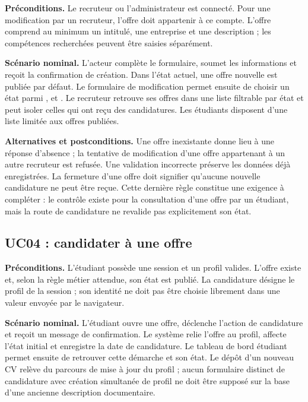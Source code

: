 \textbf{Préconditions.} Le recruteur ou l'administrateur est connecté. Pour une modification par un recruteur, l'offre doit appartenir à ce compte. L'offre comprend au minimum un intitulé, une entreprise et une description ; les compétences recherchées peuvent être saisies séparément.

\textbf{Scénario nominal.} L'acteur complète le formulaire, soumet les informations et reçoit la confirmation de création. Dans l'état actuel, une offre nouvelle est publiée par défaut. Le formulaire de modification permet ensuite de choisir un état parmi ,  et . Le recruteur retrouve ses offres dans une liste filtrable par état et peut isoler celles qui ont reçu des candidatures. Les étudiants disposent d'une liste limitée aux offres publiées.

\textbf{Alternatives et postconditions.} Une offre inexistante donne lieu à une réponse d'absence ; la tentative de modification d'une offre appartenant à un autre recruteur est refusée. Une validation incorrecte préserve les données déjà enregistrées. La fermeture d'une offre doit signifier qu'aucune nouvelle candidature ne peut être reçue. Cette dernière règle constitue une exigence à compléter : le contrôle existe pour la consultation d'une offre par un étudiant, mais la route de candidature ne revalide pas explicitement son état.

\subsection{UC04 : candidater à une offre}

\textbf{Préconditions.} L'étudiant possède une session et un profil valides. L'offre existe et, selon la règle métier attendue, son état est publié. La candidature désigne le profil de la session ; son identité ne doit pas être choisie librement dans une valeur envoyée par le navigateur.

\textbf{Scénario nominal.} L'étudiant ouvre une offre, déclenche l'action de candidature et reçoit un message de confirmation. Le système relie l'offre au profil, affecte l'état initial  et enregistre la date de candidature. Le tableau de bord étudiant permet ensuite de retrouver cette démarche et son état. Le dépôt d'un nouveau CV relève du parcours de mise à jour du profil ; aucun formulaire distinct de candidature avec création simultanée de profil ne doit être supposé sur la base d'une ancienne description documentaire.

